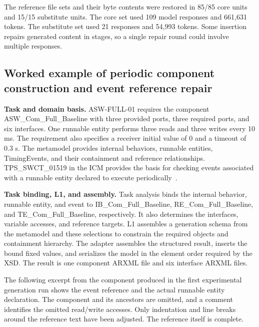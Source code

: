 \documentclass[pdflatex,iicol,sn-mathphys-num]{sn-jnl}
\newcommand{\paperref}[1]{~\citep{#1}}
\begin{document}
The reference file sets and their byte contents were restored in 85/85 core units and 15/15 substitute units. The core set used 109 model responses and 661,631 tokens. The substitute set used 21 responses and 54,993 tokens. Some insertion repairs generated content in stages, so a single repair round could involve multiple responses.


\subsection{Worked example of periodic component construction and event reference repair}\label{app:A-4}

\textbf{Task and domain basis.} ASW-FULL-01 requires the component ASW\_Com\_Full\_Baseline with three provided ports, three required ports, and six interfaces. One runnable entity performs three reads and three writes every 10 ms. The requirement also specifies a receiver initial value of 0 and a timeout of 0.3 s. The metamodel provides internal behaviors, runnable entities, TimingEvents, and their containment and reference relationships. TPS\_SWCT\_01519 in the ICM provides the basis for checking events associated with a runnable entity declared to execute periodically\paperref{AUTOSAR2015SoftwareComponentTemplate422}.


\textbf{Task binding, L1, and assembly.} Task analysis binds the internal behavior, runnable entity, and event to IB\_Com\_Full\_Baseline, RE\_Com\_Full\_Baseline, and TE\_Com\_Full\_Baseline, respectively. It also determines the interfaces, variable accesses, and reference targets. L1 assembles a generation schema from the metamodel and these selections to constrain the required objects and containment hierarchy. The adapter assembles the structured result, inserts the bound fixed values, and serializes the model in the element order required by the XSD. The result is one component ARXML file and six interface ARXML files.


The following excerpt from the component produced in the first experimental generation run shows the event reference and the actual runnable entity declaration. The component and its ancestors are omitted, and a comment identifies the omitted read/write accesses. Only indentation and line breaks around the reference text have been adjusted. The reference itself is complete.
\end{document}
